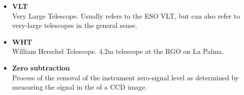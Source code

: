 \begin{itemize}
\item {\bf\label{gl_vlt}VLT}\\
      Very Large Telescope.  Usually refers to the ESO VLT, but can
      also refer to very-large telescopes in the general sense.

\item {\bf\label{gl_wht}WHT}\\
      William Herschel Telescope.  4.2m telescope at the RGO on La Palma.

\item {\bf\label{gl_zero_sub}Zero subtraction}\\
      Process of the removal of the instrument zero-signal level as
      determined by measuring the signal in the
       of a CCD image.


\end{itemize}

